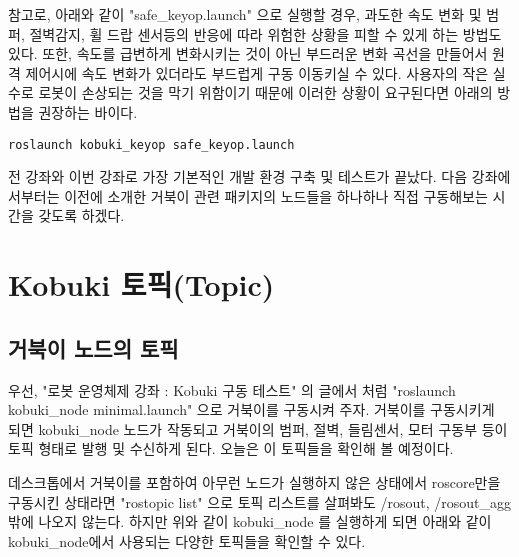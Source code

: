 \vspace{\baselineskip}
\noindent
참고로, 아래와 같이 "safe\_keyop.launch" 으로 실행할 경우, 과도한 속도 변화 및 범퍼, 절벽감지, 휠 드랍 센서등의 반응에 따라 위험한 상황을 피할 수 있게 하는 방법도 있다. 또한, 속도를 급변하게 변화시키는 것이 아닌 부드러운 변화 곡선을 만들어서 원격 제어시에 속도 변화가 있더라도 부드럽게 구동 이동키실 수 있다. 사용자의 작은 실수로 로봇이 손상되는 것을 막기 위함이기 때문에 이러한 상황이 요구된다면 아래의 방법을 권장하는 바이다.

\begin{lstlisting}[language=ROS]
roslaunch kobuki_keyop safe_keyop.launch
\end{lstlisting}

전 강좌와 이번 강좌로 가장 기본적인 개발 환경 구축 및 테스트가 끝났다. 다음 강좌에서부터는 이전에 소개한 거북이 관련 패키지의 노드들을 하나하나 직접 구동해보는 시간을 갖도록 하겠다.

\section{Kobuki 토픽(Topic)}

\subsection{거북이 노드의 토픽}

우선, "로봇 운영체제 강좌 : Kobuki 구동 테스트" 의 글에서 처럼 "roslaunch kobuki\_node minimal.launch" 으로 거북이를 구동시켜 주자. 거북이를 구동시키게 되면 kobuki\_node 노드가 작동되고 거북이의 범퍼, 절벽, 들림센서, 모터 구동부 등이 토픽 형태로 발행 및 수신하게 된다.  오늘은 이 토픽들을 확인해 볼 예정이다.

데스크톱에서 거북이를 포함하여 아무런 노드가 실행하지 않은 상태에서 roscore만을 구동시킨 상태라면 "rostopic list" 으로 토픽 리스트를 살펴봐도 /rosout, /rosout\_agg 밖에 나오지 않는다. 하지만 위와 같이 kobuki\_node 를 실행하게 되면 아래와 같이 kobuki\_node에서 사용되는 다양한 토픽들을 확인할 수 있다.

